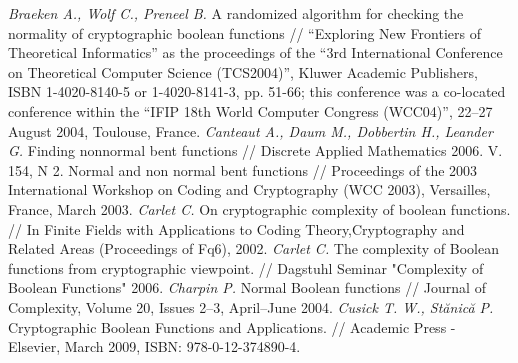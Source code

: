 \begin{thebibliography}{99}
 {\it Braeken A., Wolf C., Preneel B.} A randomized algorithm for checking the normality of cryptographic boolean functions // “Exploring New Frontiers of Theoretical Informatics” as the proceedings of the “3rd International Conference on Theoretical Computer Science (TCS2004)”, Kluwer Academic Publishers, ISBN 1-4020-8140-5 or 1-4020-8141-3, pp. 51-66; this conference was a co-located conference within the “IFIP 18th World Computer Congress (WCC04)”, 22–27 August 2004, Toulouse, France.
 {\it Canteaut A., Daum M., Dobbertin H., Leander G.} Finding nonnormal bent functions // Discrete Applied Mathematics 2006. V. 154, N 2.
 Normal and non normal bent functions // Proceedings of the 2003 International Workshop on Coding and Cryptography (WCC 2003), Versailles, France, March 2003.
 {\it Carlet C.} On cryptographic complexity of boolean functions. // In Finite Fields with Applications to Coding Theory,Cryptography and Related Areas (Proceedings of Fq6), 2002.
 {\it Carlet C.} The complexity of Boolean functions from cryptographic viewpoint. // Dagstuhl Seminar "Complexity of Boolean Functions" 2006.
 {\it Charpin P.} Normal Boolean functions // Journal of Complexity, Volume 20, Issues 2–3, April–June 2004.
 {\it Cusick T. W., Stănică P.} Cryptographic Boolean Functions and Applications. // Academic Press - Elsevier, March 2009, ISBN: 978-0-12-374890-4.

\end{thebibliography}
